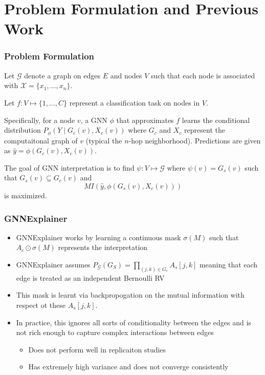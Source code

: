 \documentclass[11pt]{beamer}
\begin{document}
\section{Problem Formulation and Previous Work}
\begin{frame}
    \frametitle{Problem Formulation}

    Let $\mathcal{G}$ denote a graph on edges $E$ and nodes $V$ such that each node is associated with $\mathcal{X} = \{x_1, \dots, x_n\}$.

    \bigskip

    Let $f : V \mapsto \{1, \dots, C\}$ represent a classification task on nodes in $V$. 

    \bigskip
    
    Specifically, for a node $v$, a GNN $\phi$ that approximates $f$ learns the conditional distribution $P_{\phi}(Y \mid G_c(v), X_c(v))$ where $G_c$ and $X_c$ represent the computaitonal graph of $v$ (typical the $n$-hop neighborhood). Predictions are given as $\hat{y} = \phi(G_c(v), X_c(v))$.

    \bigskip

    The goal of GNN interpretation is to find $\psi : V \mapsto \mathcal{G}$ where $\psi(v) = G_s(v)$ such that $G_s(v) \subseteq G_c(v)$ and
    \[
        MI(\hat{y}, \phi(G_s(v), X_c(v))) 
    \]
    is maximized.
\end{frame}

\begin{frame}
    \frametitle{GNNExplainer}

    \begin{itemize}
        \item GNNExplainer works by learning a continuous mask $\sigma(M)$ such that $A_c \odot \sigma(M)$ represents the interpretation
        \item GNNExplainer assumes $P_{\mathcal{G}}(G_S) = \prod_{(j,k) \in G_c} A_s[j, k]$ meaning that each edge is treated as an independent Bernoulli RV
        \item This mask is learnt via backpropogation on the mutual information with respect ot these $A_s[j, k]$. 
        \item In practice, this ignores all sorts of conditionality between the edges and is not rich enough to capture complex interactions between edges
        \begin{itemize}
            \item Does not perform well in replicaiton studies
            \item Has extremely high variance and does not converge consistently
        \end{itemize}
    \end{itemize}
\end{frame}
\end{document}
